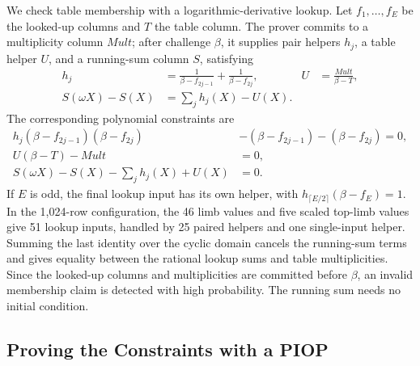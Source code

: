 We check table membership with a logarithmic-derivative lookup. Let \(f_1,\ldots,f_E\) be the looked-up columns and \(T\) the table column. The prover commits to a multiplicity column \(Mult\); after challenge \(\beta\), it supplies pair helpers \(h_j\), a table helper \(U\), and a running-sum column \(S\), satisfying
\[
\begin{aligned}
h_j&=\frac{1}{\beta-f_{2j-1}}+\frac{1}{\beta-f_{2j}},&
U&=\frac{Mult}{\beta-T},\\
S(\omega X)-S(X)&=\sum_j h_j(X)-U(X).
\end{aligned}
\]
The corresponding polynomial constraints are
\[
\begin{aligned}
h_j(\beta-f_{2j-1})(\beta-f_{2j})
 &-(\beta-f_{2j-1})-(\beta-f_{2j})=0,\\
U(\beta-T)-Mult&=0,\\
S(\omega X)-S(X)-\sum_j h_j(X)+U(X)&=0.
\end{aligned}\tag{F23}
\]
If \(E\) is odd, the final lookup input has its own helper, with \(h_{\lceil E/2\rceil}(\beta-f_E)=1\). In the 1,024-row configuration, the 46 limb values and five scaled top-limb values give 51 lookup inputs, handled by 25 paired helpers and one single-input helper.
Summing the last identity over the cyclic domain cancels the running-sum terms and gives equality between the rational lookup sums and table multiplicities. Since the looked-up columns and multiplicities are committed before \(\beta\), an invalid membership claim is detected with high probability. The running sum needs no initial condition.

\subsection{Proving the Constraints with a PIOP}
\label{app:piop}

